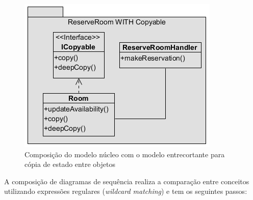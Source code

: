   \begin{figure}[!h]
	\centering
	\includegraphics{img/structural_composition_example.png}
	\caption{Composição do modelo núcleo com o modelo entrecortante para cópia de estado entre objetos}\label{fig:structural_composition_example}
  \end{figure}

A composição de diagramas de sequência realiza a comparação entre conceitos utilizando expressões regulares (\textit{wildcard matching}) e tem os
seguintes passos:
  
